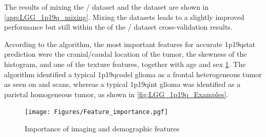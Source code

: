 The results of mixing the / dataset and the  dataset are shown in \cref{app:LGG_1p19q_mixing}.
Mixing the datasets leads to a slightly improved performance but still within the  of the / dataset cross-validation results.

According to the algorithm, the most important features for accurate \acl{1p19qstat} prediction were the cranial/caudal location of the \gls{tumor}, the skewness of the   histogram, and one of the texture features, together with age and sex \cref{fig:LGG_1p19q_feature_importance}.
The algorithm identified a typical \acl{1p19qcodel} glioma as a frontal heterogeneous \gls{tumor} as seen on  and  scans, whereas a typical \acl{1p19qint} glioma was identified as a parietal homogeneous \gls{tumor}, as shown in \cref{fig:LGG_1p19q_Examples}.


\begin{figure}
\centering
\texttt{[image: Figures/Feature\_importance.pgf]}
\caption{Importance of imaging and demographic features}\label{fig:LGG_1p19q_feature_importance}
\end{figure}


